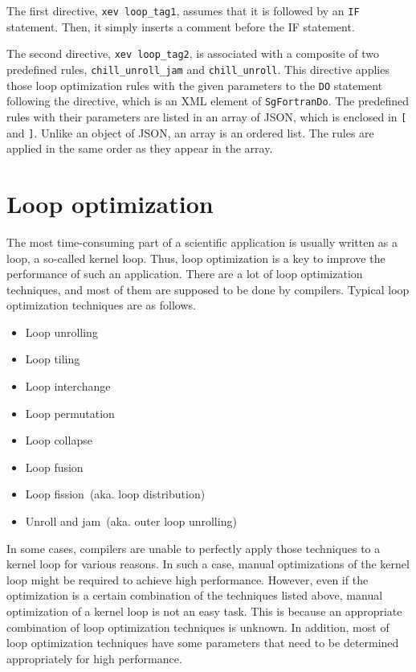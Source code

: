 The first directive, \texttt{xev loop\_tag1}, assumes that it is
followed by an \texttt{IF} statement. Then, it simply inserts a comment
before the IF statement.

The second directive, \texttt{xev loop\_tag2}, is associated with a
composite of two predefined rules, \texttt{chill\_unroll\_jam} and
\texttt{chill\_unroll}.  This directive applies those loop optimization
rules with the given parameters to the \texttt{DO} statement following
the directive, which is an XML element of \texttt{SgFortranDo}.  The
predefined rules with their parameters are listed in an array of JSON,
which is enclosed in \texttt{[} and \texttt{]}. Unlike an object of
JSON, an array is an ordered list. The rules are applied in the same
order as they appear in the array.

\section{Loop optimization}
The most time-consuming part of a scientific application is usually
written as a loop, a so-called kernel loop.  Thus, loop optimization is
a key to improve the performance of such an application.  There are a
lot of loop optimization techniques, and most of them are supposed to be
done by compilers. Typical loop optimization techniques are as follows.
\begin{itemize}
 \item Loop unrolling
 \item Loop tiling
 \item Loop interchange
 \item Loop permutation
 \item Loop collapse
 \item Loop fusion
 \item Loop fission~(aka. loop distribution)
 \item Unroll and jam~(aka. outer loop unrolling)
\end{itemize}

In some cases, compilers are unable to perfectly apply those techniques
to a kernel loop for various reasons.  In such a case, manual
optimizations of the kernel loop might be required to achieve high
performance. However, even if the optimization is a certain combination
of the techniques listed above, manual optimization of a kernel loop is
not an easy task. This is because an appropriate combination of loop
optimization techniques is unknown. In addition, most of loop
optimization techniques have some parameters that need to be determined
appropriately for high performance.

